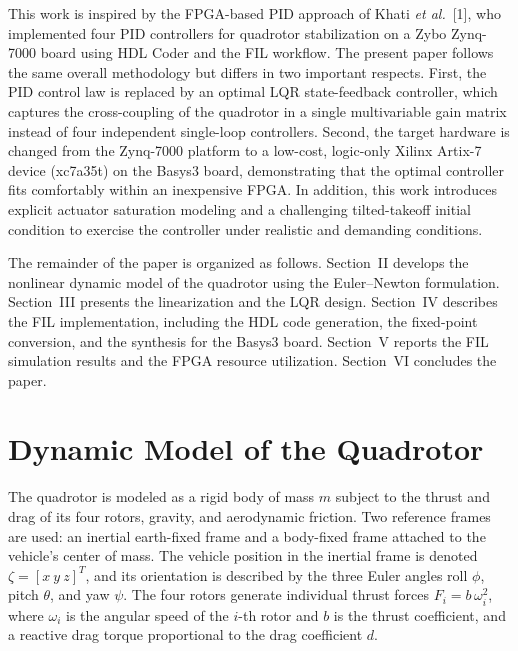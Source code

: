 \documentclass[conference]{IEEEtran}
\begin{document}
This work is inspired by the FPGA-based PID approach of Khati \textit{et al.}~[1], who implemented four PID controllers for quadrotor stabilization on a Zybo Zynq-7000 board using HDL Coder and the FIL workflow. The present paper follows the same overall methodology but differs in two important respects. First, the PID control law is replaced by an optimal LQR state-feedback controller, which captures the cross-coupling of the quadrotor in a single multivariable gain matrix instead of four independent single-loop controllers. Second, the target hardware is changed from the Zynq-7000 platform to a low-cost, logic-only Xilinx Artix-7 device (xc7a35t) on the Basys3 board, demonstrating that the optimal controller fits comfortably within an inexpensive FPGA. In addition, this work introduces explicit actuator saturation modeling and a challenging tilted-takeoff initial condition to exercise the controller under realistic and demanding conditions.

The remainder of the paper is organized as follows. Section~II develops the nonlinear dynamic model of the quadrotor using the Euler--Newton formulation. Section~III presents the linearization and the LQR design. Section~IV describes the FIL implementation, including the HDL code generation, the fixed-point conversion, and the synthesis for the Basys3 board. Section~V reports the FIL simulation results and the FPGA resource utilization. Section~VI concludes the paper.

\section{Dynamic Model of the Quadrotor}
The quadrotor is modeled as a rigid body of mass $m$ subject to the thrust and drag of its four rotors, gravity, and aerodynamic friction. Two reference frames are used: an inertial earth-fixed frame and a body-fixed frame attached to the vehicle's center of mass. The vehicle position in the inertial frame is denoted $\zeta = [x\ y\ z]^{T}$, and its orientation is described by the three Euler angles roll $\phi$, pitch $\theta$, and yaw $\psi$. The four rotors generate individual thrust forces $F_i = b\,\omega_i^{2}$, where $\omega_i$ is the angular speed of the $i$-th rotor and $b$ is the thrust coefficient, and a reactive drag torque proportional to the drag coefficient $d$.
\end{document}
